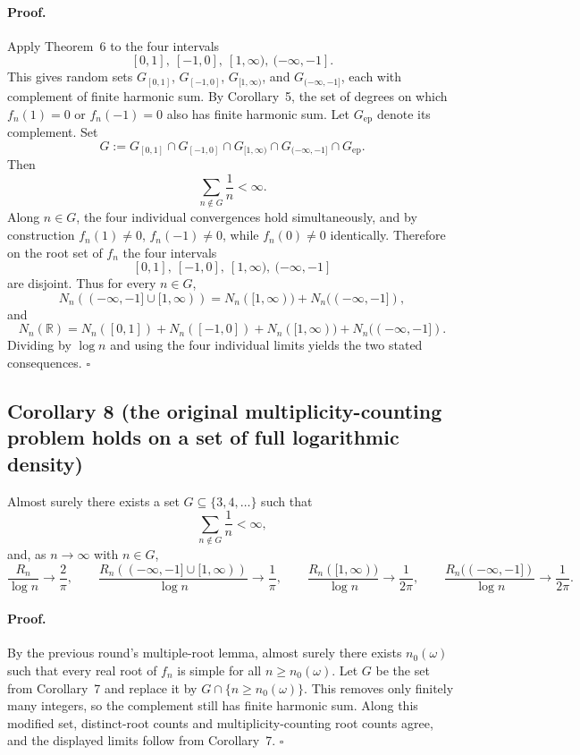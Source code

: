 \paragraph{Proof.}
Apply Theorem~6 to the four intervals
\[
[0,1],\ [-1,0],\ [1,\infty),\ (-\infty,-1].
\]
This gives random sets $G_{[0,1]}$, $G_{[-1,0]}$, $G_{[1,\infty)}$, and $G_{(-\infty,-1]}$, each with complement of finite harmonic sum. By Corollary~5, the set of degrees on which $f_n(1)=0$ or $f_n(-1)=0$ also has finite harmonic sum. Let $G_{\mathrm{ep}}$ denote its complement. Set
\[
G:=G_{[0,1]}\cap G_{[-1,0]}\cap G_{[1,\infty)}\cap G_{(-\infty,-1]}\cap G_{\mathrm{ep}}.
\]
Then
\[
\sum_{n\notin G}\frac1n<\infty.
\]
Along $n\in G$, the four individual convergences hold simultaneously, and by construction $f_n(1)\neq0$, $f_n(-1)\neq0$, while $f_n(0)\neq0$ identically. Therefore on the root set of $f_n$ the four intervals
\[
[0,1],\ [-1,0],\ [1,\infty),\ (-\infty,-1]
\]
are disjoint. Thus for every $n\in G$,
\[
N_n((-\infty,-1]\cup[1,\infty))
=
N_n([1,\infty))+N_n((-\infty,-1]),
\]
and
\[
N_n(\mathbb R)
=
N_n([0,1])+N_n([-1,0])+N_n([1,\infty))+N_n((-\infty,-1]).
\]
Dividing by $\log n$ and using the four individual limits yields the two stated consequences.
\hfill$\square$

\subsection*{Corollary 8 (the original multiplicity-counting problem holds on a set of full logarithmic density)}
Almost surely there exists a set $G\subseteq\{3,4,\dots\}$ such that
\[
\sum_{n\notin G}\frac1n<\infty,
\]
and, as $n\to\infty$ with $n\in G$,
\[
\frac{R_n}{\log n}\to\frac{2}{\pi},
\qquad
\frac{R_n((-\infty,-1]\cup[1,\infty))}{\log n}\to\frac{1}{\pi},
\qquad
\frac{R_n([1,\infty))}{\log n}\to\frac{1}{2\pi},
\qquad
\frac{R_n((-\infty,-1])}{\log n}\to\frac{1}{2\pi}.
\]

\paragraph{Proof.}
By the previous round's multiple-root lemma, almost surely there exists $n_0(\omega)$ such that every real root of $f_n$ is simple for all $n\ge n_0(\omega)$. Let $G$ be the set from Corollary~7 and replace it by $G\cap\{n\ge n_0(\omega)\}$. This removes only finitely many integers, so the complement still has finite harmonic sum. Along this modified set, distinct-root counts and multiplicity-counting root counts agree, and the displayed limits follow from Corollary~7.
\hfill$\square$

